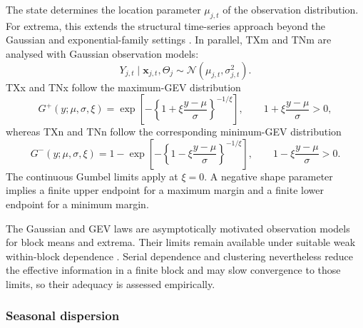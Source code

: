 \documentclass[11pt,a4paper]{article}
\newcommand{\N}{\mathcal N}
\begin{document}
	The state determines the location parameter \(\mu_{j,t}\) of the
	observation distribution. For extrema, this extends the structural
	time-series approach beyond the Gaussian and exponential-family settings
	\citep{helske2017}. In parallel, TXm and TNm are analysed with Gaussian
	observation models:
	\begin{equation}\label{eq:gaussian-observation}
		Y_{j,t}\mid\bm x_{j,t},\Theta_j
		\sim\N(\mu_{j,t},\sigma_{j,t}^2).
	\end{equation}
	TXx and TNx follow the maximum-GEV distribution
	\begin{equation}\label{eq:gev}
		G^+(y;\mu,\sigma,\xi)
		=
		\exp\!\left[
		-\left\{1+\xi\frac{y-\mu}{\sigma}\right\}^{-1/\xi}
		\right],
		\qquad
		1+\xi\frac{y-\mu}{\sigma}>0,
	\end{equation}
	whereas TXn and TNn follow the corresponding minimum-GEV distribution
	\begin{equation}\label{eq:gevmin}
		G^-(y;\mu,\sigma,\xi)
		=
		1-
		\exp\!\left[
		-\left\{1-\xi\frac{y-\mu}{\sigma}\right\}^{-1/\xi}
		\right],
		\qquad
		1-\xi\frac{y-\mu}{\sigma}>0.
	\end{equation}
	The continuous Gumbel limits apply at \(\xi=0\). A negative shape parameter
	implies a finite upper endpoint for a maximum margin and a finite lower
	endpoint for a minimum margin.
	
	The Gaussian and GEV laws are asymptotically motivated observation models
	for block means and extrema. Their limits remain available under suitable
	weak within-block dependence \citep{leadbetter1983}. Serial dependence and
	clustering nevertheless reduce the effective information in a finite block
	and may slow convergence to those limits, so their adequacy is assessed
	empirically.
	
	\subsubsection{Seasonal dispersion}
	\label{subsec:seasonal-dispersion}
	
\end{document}
